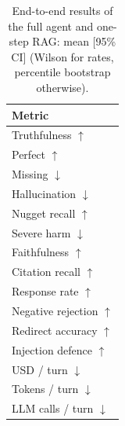 \begin{table}[tb]
\centering
\caption{End-to-end results of the full agent and one-step RAG: mean [95\% CI] (Wilson for rates, percentile bootstrap otherwise).}\label{tab:e2e-main}
\footnotesize
\begin{tabular}{l}
\toprule
Metric \\
\midrule
Truthfulness $\uparrow$ \\
Perfect $\uparrow$ \\
Missing $\downarrow$ \\
Hallucination $\downarrow$ \\
Nugget recall $\uparrow$ \\
Severe harm $\downarrow$ \\
Faithfulness $\uparrow$ \\
Citation recall $\uparrow$ \\
Response rate $\uparrow$ \\
Negative rejection $\uparrow$ \\
Redirect accuracy $\uparrow$ \\
Injection defence $\uparrow$ \\
USD / turn $\downarrow$ \\
Tokens / turn $\downarrow$ \\
LLM calls / turn $\downarrow$ \\
\bottomrule
\end{tabular}
\end{table}
